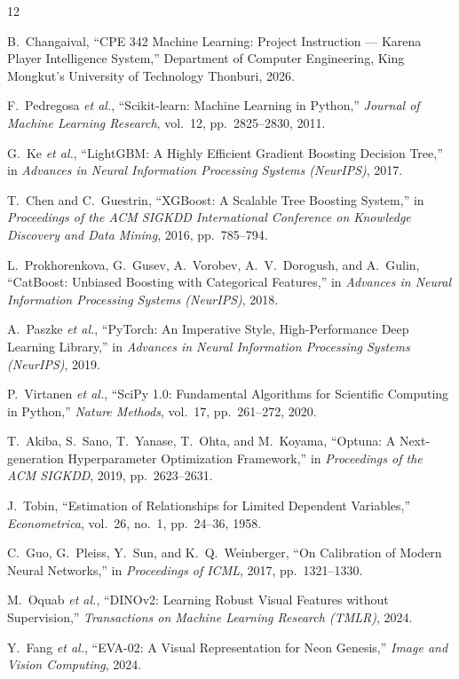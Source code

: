 \documentclass[11pt,a4paper]{article}
\renewcommand{\refname}{บรรณานุกรม}
\begin{document}
\clearpage
\renewcommand{\refname}{บรรณานุกรม}
\begin{thebibliography}{12}

 B.~Changaival, ``CPE 342 Machine Learning: Project Instruction --- Karena Player Intelligence System,'' Department of Computer Engineering, King Mongkut's University of Technology Thonburi, 2026.

 F.~Pedregosa \textit{et al.}, ``Scikit-learn: Machine Learning in Python,'' \textit{Journal of Machine Learning Research}, vol.~12, pp.~2825--2830, 2011.

 G.~Ke \textit{et al.}, ``LightGBM: A Highly Efficient Gradient Boosting Decision Tree,'' in \textit{Advances in Neural Information Processing Systems (NeurIPS)}, 2017.

 T.~Chen and C.~Guestrin, ``XGBoost: A Scalable Tree Boosting System,'' in \textit{Proceedings of the ACM SIGKDD International Conference on Knowledge Discovery and Data Mining}, 2016, pp.~785--794.

 L.~Prokhorenkova, G.~Gusev, A.~Vorobev, A.~V.~Dorogush, and A.~Gulin, ``CatBoost: Unbiased Boosting with Categorical Features,'' in \textit{Advances in Neural Information Processing Systems (NeurIPS)}, 2018.

 A.~Paszke \textit{et al.}, ``PyTorch: An Imperative Style, High-Performance Deep Learning Library,'' in \textit{Advances in Neural Information Processing Systems (NeurIPS)}, 2019.

 P.~Virtanen \textit{et al.}, ``SciPy 1.0: Fundamental Algorithms for Scientific Computing in Python,'' \textit{Nature Methods}, vol.~17, pp.~261--272, 2020.

 T.~Akiba, S.~Sano, T.~Yanase, T.~Ohta, and M.~Koyama, ``Optuna: A Next-generation Hyperparameter Optimization Framework,'' in \textit{Proceedings of the ACM SIGKDD}, 2019, pp.~2623--2631.

 J.~Tobin, ``Estimation of Relationships for Limited Dependent Variables,'' \textit{Econometrica}, vol.~26, no.~1, pp.~24--36, 1958.

 C.~Guo, G.~Pleiss, Y.~Sun, and K.~Q.~Weinberger, ``On Calibration of Modern Neural Networks,'' in \textit{Proceedings of ICML}, 2017, pp.~1321--1330.

 M.~Oquab \textit{et al.}, ``DINOv2: Learning Robust Visual Features without Supervision,'' \textit{Transactions on Machine Learning Research (TMLR)}, 2024.

 Y.~Fang \textit{et al.}, ``EVA-02: A Visual Representation for Neon Genesis,'' \textit{Image and Vision Computing}, 2024.

\end{thebibliography}
\end{document}
